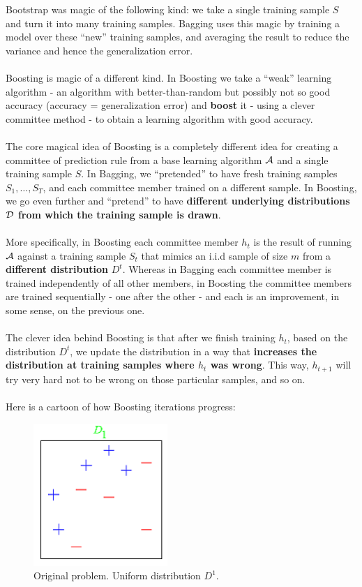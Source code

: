 Bootstrap was magic of the following kind: we take a single
training sample $S$ and turn it into many training samples. Bagging uses this
magic by training a model over these ``new'' training samples, and averaging the
result to reduce the variance and hence the generalization error.
\\~\\
Boosting is magic of a different kind. In Boosting we take a ``weak'' learning
algorithm - an algorithm with better-than-random but possibly not so good accuracy (accuracy = generalization error) and {\bf
boost} it - using a clever committee method - to obtain a learning algorithm
with good accuracy. 
\\~\\
The core magical idea of Boosting is a completely different idea for creating a committee of prediction
rule from a base learning algorithm
$\mathcal{A}$ and a single training sample $S$. 
In Bagging, we ``pretended'' to have fresh training samples $S_1,\ldots,
S_T$, and each committee member trained on a different sample. In Boosting, we go
even further and ``pretend'' to have {\bf different underlying distributions $\mathcal{D}$
from which the training sample is drawn}.
\\~\\
More specifically, in Boosting each committee member $h_t$ is the result of
running $\mathcal{A}$ against a training sample $S_t$ that mimics an i.i.d sample of
size $m$ 
from a {\bf different distribution} $D^t$. Whereas in Bagging each committee
member is trained independently of all other members, in Boosting the committee
members are trained sequentially - one after the other - and each is an
improvement, in some sense, on the previous one. 
\\~\\
The clever idea behind Boosting is that after we finish training $h_t$, based on
the distribution $D^t$, 
we
update the distribution in a way that {\bf increases the distribution at training
samples where $h_t$ was wrong}. This way, $h_{t+1}$ will try very hard not to be
wrong on those particular samples, and so on. 
\\~\\
Here is a cartoon of how Boosting iterations progress:
\begin{figure}[H]
  \centering
  \includegraphics[width=2in]{boosting_toy0.png}
  \caption{Original problem. Uniform distribution $D^1$.}
\end{figure}
